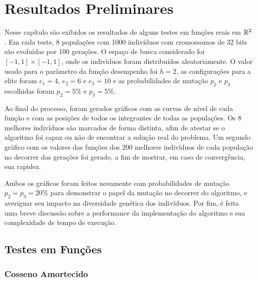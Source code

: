 \chapter{Resultados Preliminares}\label{cap_resultados}

Nesse capítulo são exibidos os resultados de alguns testes em funções reais em $\mathbb{R}^2$. Em cada teste, 
8 populações com 1000 indivíduos com cromossomos de 32 bits são evoluídas por 100 gerações. O espaço de busca
considerado foi $ [-1,1] \times [-1, 1] $, onde os indivíduos foram distribuídos aleatoriamente. 
O valor usado para o parâmetro da função desempenho foi $h = 2$,
as configurações para a elite foram $e_1 = 4$, $e_2 = 6$ e $e_3 = 10$ e as probabilidades de mutação $p_2$ e $p_3$ escolhidas
foram $p_2 = 5\%$ e $p_3 = 5\%$.

Ao final do processo,
foram gerados gráficos com as curvas de nível de cada função e com as posições de todos os
integrantes de todas as populações. Os 8 melhores indivíduos são marcados de forma distinta,
afim de atestar se o algoritmo foi capaz ou não de encontrar a solução real do problema.
Um segundo gráfico com os valores das funções dos 200 melhores indivíduos de cada população
no decorrer das gerações foi gerado, a fim de mostrar, em caso de convergência, sua rapidez.

Ambos os gráficos foram feitos novamente com probabilidades de mutação $p_2 = p_3 = 20\%$
para demonstrar o papel da mutação no decorrer do algoritmo, e averiguar seu impacto na diversidade genética
dos indivíduos.
Por fim, é feita uma breve discussão sobre a performance da implementação do algoritmo e sua
complexidade de tempo de execução.

\section{Testes em Funções}

\subsection{Cosseno Amortecido}

